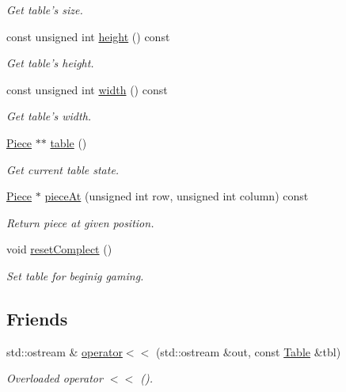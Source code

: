 \begin{DoxyCompactItemize}
\begin{DoxyCompactList}\small\item\em Get table's size. \item\end{DoxyCompactList}\item 
const unsigned int \hyperlink{classChEngn_1_1Table_a9502a1090bcb852c162934a792c2360a}{height} () const 
\begin{DoxyCompactList}\small\item\em Get table's height. \item\end{DoxyCompactList}\item 
const unsigned int \hyperlink{classChEngn_1_1Table_a6aaaaae9343e67a947b0cdeb6104361b}{width} () const 
\begin{DoxyCompactList}\small\item\em Get table's width. \item\end{DoxyCompactList}\item 
\hyperlink{classChEngn_1_1Piece}{Piece} $\ast$$\ast$ \hyperlink{classChEngn_1_1Table_a7e403087a7979907ca171e20462f8346}{table} ()
\begin{DoxyCompactList}\small\item\em Get current table state. \item\end{DoxyCompactList}\item 
\hyperlink{classChEngn_1_1Piece}{Piece} $\ast$ \hyperlink{classChEngn_1_1Table_afd9b5d81da9d90ee6fcae57651f08d40}{pieceAt} (unsigned int row, unsigned int column) const 
\begin{DoxyCompactList}\small\item\em Return piece at given position. \item\end{DoxyCompactList}\item 
void \hyperlink{classChEngn_1_1Table_a8ece9e9f9f28f209d72f16db0fb2aeed}{resetComplect} ()
\begin{DoxyCompactList}\small\item\em Set table for beginig gaming. \item\end{DoxyCompactList}\end{DoxyCompactItemize}
\subsection*{Friends}
\begin{DoxyCompactItemize}
\item 
std::ostream \& \hyperlink{classChEngn_1_1Table_a9a39b79ad3a5635dfe8075f14598886e}{operator$<$$<$} (std::ostream \&out, const \hyperlink{classChEngn_1_1Table}{Table} \&tbl)
\begin{DoxyCompactList}\small\item\em Overloaded operator $<$$<$ (). \item\end{DoxyCompactList}\end{DoxyCompactItemize}


